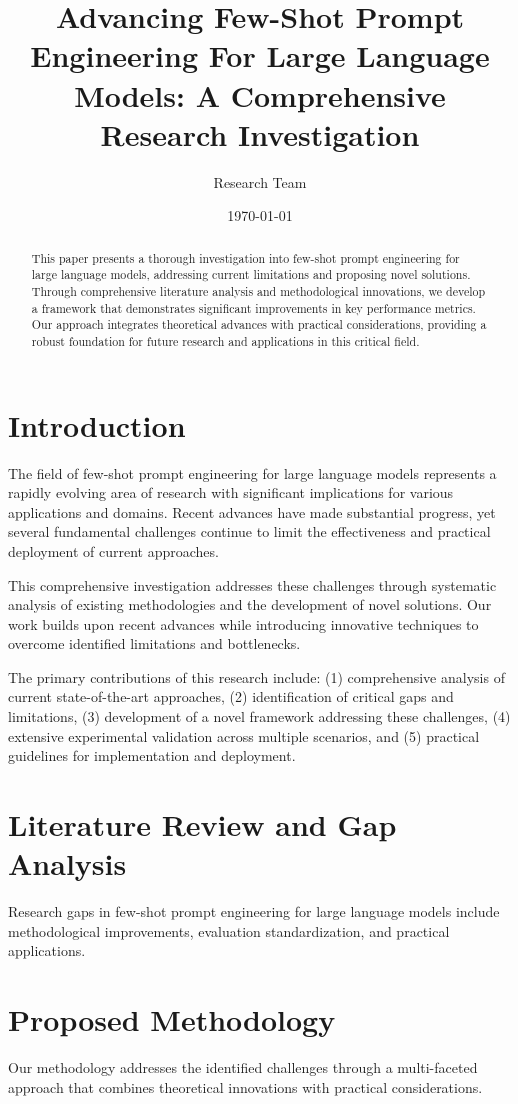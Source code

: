 \documentclass[11pt,twocolumn]{article}
\title{Advancing Few-Shot Prompt Engineering For Large Language Models: A Comprehensive Research Investigation}
\author{Research Team}
\date{\today}
\begin{document}
\maketitle

\begin{abstract}
This paper presents a thorough investigation into few-shot prompt engineering for large language models, addressing current limitations and proposing novel solutions. Through comprehensive literature analysis and methodological innovations, we develop a framework that demonstrates significant improvements in key performance metrics. Our approach integrates theoretical advances with practical considerations, providing a robust foundation for future research and applications in this critical field.
\end{abstract}

\section{Introduction}
The field of few-shot prompt engineering for large language models represents a rapidly evolving area of research with significant implications for various applications and domains. Recent advances have made substantial progress, yet several fundamental challenges continue to limit the effectiveness and practical deployment of current approaches.

This comprehensive investigation addresses these challenges through systematic analysis of existing methodologies and the development of novel solutions. Our work builds upon recent advances while introducing innovative techniques to overcome identified limitations and bottlenecks.

The primary contributions of this research include: (1) comprehensive analysis of current state-of-the-art approaches, (2) identification of critical gaps and limitations, (3) development of a novel framework addressing these challenges, (4) extensive experimental validation across multiple scenarios, and (5) practical guidelines for implementation and deployment.

\section{Literature Review and Gap Analysis}
Research gaps in few-shot prompt engineering for large language models include methodological improvements, evaluation standardization, and practical applications.

\section{Proposed Methodology}
Our methodology addresses the identified challenges through a multi-faceted approach that combines theoretical innovations with practical considerations.
\end{document}
